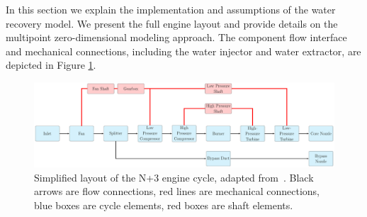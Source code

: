 \documentclass[conf]{new-aiaa}
\begin{document}
In this section we explain the implementation and assumptions of the water recovery model.
We present the full engine layout and provide details on the multipoint zero-dimensional modeling approach.
The component flow interface and mechanical connections, including the water injector and water extractor, are depicted in Figure \ref{fig:N3_original}.

\begin{figure}[hbt!]
    \centering
    \includegraphics[width=1.0\textwidth]{N3_cycle.pdf}
    \caption{
        Simplified layout of the N+3 engine cycle, adapted from~\citet{Hendricks2019}.
        Black arrows are flow connections, red lines are mechanical connections, blue boxes are cycle elements, red boxes are shaft elements.
    }
    \label{fig:N3_original}
\end{figure}
\end{document}
